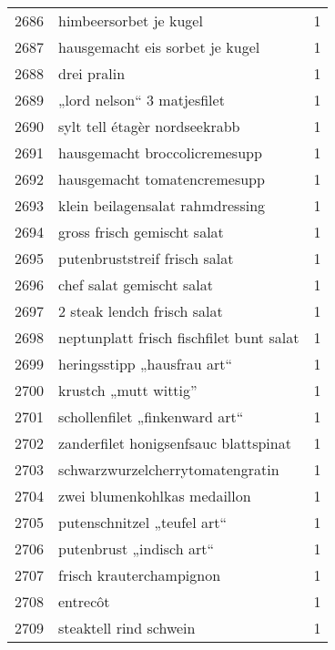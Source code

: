 \begin{tabular}{llr}
2686 &                             himbeersorbet je kugel &      1 \\
2687 &                    hausgemacht eis sorbet je kugel &      1 \\
2688 &                                        drei pralin &      1 \\
2689 &                        „lord nelson“ 3 matjesfilet &      1 \\
2690 &                      sylt tell étagèr nordseekrabb &      1 \\
2691 &                      hausgemacht broccolicremesupp &      1 \\
2692 &                       hausgemacht tomatencremesupp &      1 \\
2693 &                   klein beilagensalat rahmdressing &      1 \\
2694 &                        gross frisch gemischt salat &      1 \\
2695 &                      putenbruststreif frisch salat &      1 \\
2696 &                          chef salat gemischt salat &      1 \\
2697 &                        2 steak lendch frisch salat &      1 \\
2698 &           neptunplatt frisch fischfilet bunt salat &      1 \\
2699 &                        heringsstipp „hausfrau art“ &      1 \\
2700 &                              krustch „mutt wittig” &      1 \\
2701 &                     schollenfilet „finkenward art“ &      1 \\
2702 &              zanderfilet honigsenfsauc blattspinat &      1 \\
2703 &                   schwarzwurzelcherrytomatengratin &      1 \\
2704 &                       zwei blumenkohlkas medaillon &      1 \\
2705 &                        putenschnitzel „teufel art“ &      1 \\
2706 &                           putenbrust „indisch art“ &      1 \\
2707 &                           frisch krauterchampignon &      1 \\
2708 &                                           entrecôt &      1 \\
2709 &                             steaktell rind schwein &      1 \\

\end{tabular}
